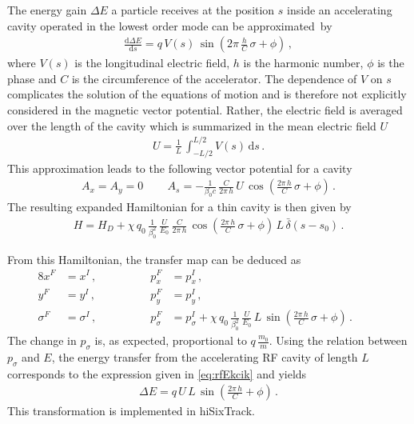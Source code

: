 The energy gain $\Delta E$ a particle receives at the position $s$ inside an accelerating cavity operated in the  lowest order mode can be \mbox{approximated by}
%
\begin{align}
 \frac{\mathrm{d} \Delta E}{\mathrm{d} s} = q \,  V(s) \, \sin \left( 2 \pi \, \frac{h}{C} \, \sigma + \phi \right) \, , \label{eq:rfEkcik}
\end{align}
%
where $V(s)$ is the longitudinal electric field, $h$ is the harmonic number, $\phi$ is the phase and $C$ is the circumference of the accelerator. The dependence of $V$ on $s$ complicates the solution of the equations of motion and is therefore not explicitly considered in the magnetic vector potential. Rather, the electric field is averaged over the length of the cavity which is summarized in the mean electric field $U$~\cite{wolski2014beam}
%
\begin{align}
  U = \frac{1}{L} \, \int_{-L/2}^{L/2} V(s) \, \mathrm{d} s \, .
\end{align}
%
This approximation leads to the following vector potential for a cavity~\cite{CERN-SL-95-12}
%
\begin{align}
A_x = A_y =0 \, \quad \quad A_s = - \frac{1}{\beta_0 c} \,  \frac{C}{2 \pi \, h} \,  U \,  \cos \left( \frac{2 \pi \, h}{C} \, \sigma + \phi  \right) \, .
\end{align}
%
The resulting expanded Hamiltonian for a thin cavity is then given by
%
\begin{align}
  H = H_D + \chi \, q_0 \, \frac{1}{\beta_0^2}\, \frac{U}{E_0} \, \frac{C}{2 \pi \, h}   \, \cos \left( \frac{2 \pi \, h}{C} \, \sigma + \phi  \right) \, L \, \bar{\delta}(s-s_0) \, .
\end{align}

%
From this Hamiltonian, the transfer map can be deduced as
%
\begin{alignat}{8}
x^F & =  x^I \, ,  \quad \quad \quad \quad &p_x^F &=   p_x^I \, , && \\ 
y^F & =  y^I \, ,  \quad \quad \quad \quad &p_y^F &=  p_y^I \, ,&&  \\ 
\sigma^F & =  \sigma^I \, ,  \quad \quad \quad \quad &p_\sigma^F &=  p_\sigma^I + \chi \, q_0 \, \frac{1}{\beta_0^2}  \, \frac{U}{E_0} \, L \, \sin \left(  \frac{2 \pi \, h}{C} \, \sigma + \phi \right) \, .   &&  &
\end{alignat}
%
The change in $p_\sigma$ is, as expected, proportional to $q\, \frac{m_0}{m}$. Using the relation between $p_\sigma$ and $E$, the energy transfer from the accelerating RF cavity of length $L$ corresponds to the expression given in \eqref{eq:rfEkcik} and yields
%
\begin{align}
  \Delta E = q \, U \, L \, \sin \left(  \frac{2 \pi \, h}{C} + \phi \right) \, .
\end{align}
This transformation is implemented in hiSixTrack.


